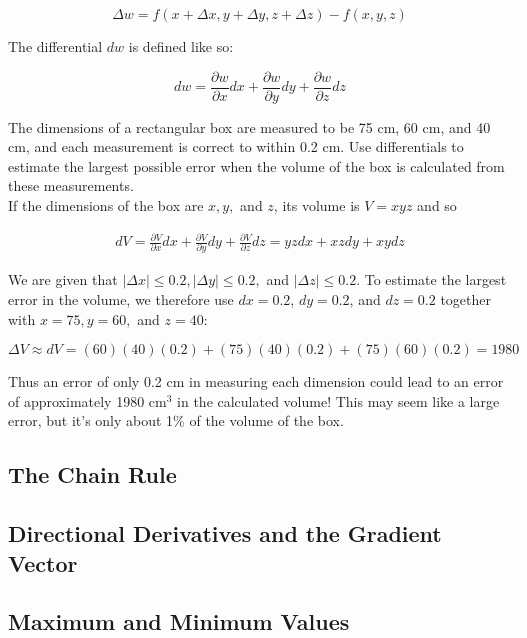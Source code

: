         \[
            \Delta w = f(x + \Delta x, y + \Delta y, z + \Delta z) - f(x,y,z)
        \]

        The differential $dw$ is defined like so:

        \[
            dw = \frac{\partial w}{\partial x}dx + \frac{\partial w}{\partial y}dy + \frac{\partial w}{\partial z}dz
        \]

        \textit{} The dimensions of a rectangular box are measured to be 75 cm, 60 cm, and 40 cm, and each measurement is correct to within 0.2 cm. Use differentials to estimate the largest possible
        error when the volume of the box is calculated from these measurements. \\

        If the dimensions of the box are $x,y,$ and $z$, its volume is $V=xyz$ and so

        \begin{align*}
            dV = \frac{\partial V}{\partial x}dx + \frac{\partial V}{\partial y}dy + \frac{\partial V}{\partial z}dz = yz dx + xz dy + xy dz
        \end{align*}

        We are given that $|\Delta x| \leq 0.2, |\Delta y| \leq 0.2,$ and $|\Delta z| \leq 0.2$. To estimate the largest error in the volume, we therefore use $dx = 0.2$, $dy = 0.2$, and $dz = 0.2$ together with
        $x=75, y = 60,$ and $z=40$:

        \[
            \Delta V \approx dV = (60)(40)(0.2) + (75)(40)(0.2) + (75)(60)(0.2) = 1980
        \]

        Thus an error of only 0.2 cm in measuring each dimension could lead to an error of approximately 1980 $\text{cm}^3$ in the calculated volume! This may seem like a large error, but it's only about 1\% of the
        volume of the box.

    \subsection{The Chain Rule}     %


    \subsection{Directional Derivatives and the Gradient Vector}    %
    \subsection{Maximum and Minimum Values}     %

